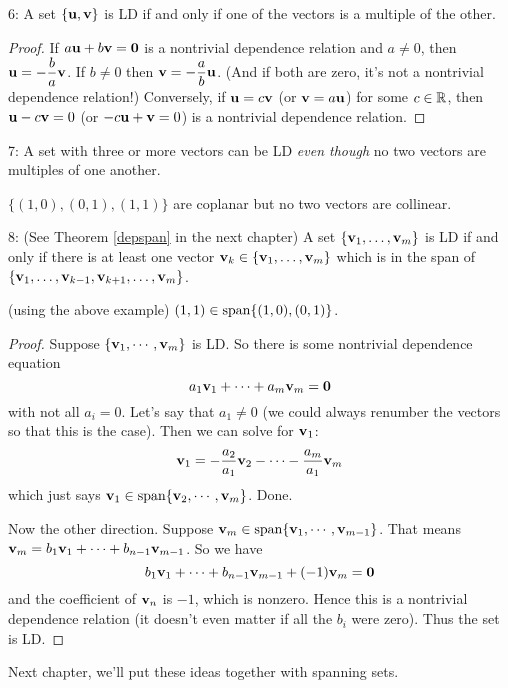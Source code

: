 \begin{fac} 6: A set $\{\mathbf{u},\mathbf{v}\}$ is LD if and only if one of the
vectors is a multiple of the other.\end{fac}

\begin{proof}  If $a\mathbf{u} + b\mathbf{v} = \mathbf{0}$ is a nontrivial dependence
relation and $a\neq 0$, then $\mathbf{u} = -\dfrac{b}{a} \mathbf{v}$.  If $b\neq 0$
then $\mathbf{v} =-\dfrac{a}{b} \mathbf{u}$.  (And if both are zero, it's not a nontrivial
dependence relation!) Conversely, if $\mathbf{u}= c \mathbf{v}$ (or $\mathbf{v}=a\mathbf{u}$) for some $c\in \mathbb{R}$, then $\mathbf{u}-c\mathbf{v}=0$  (or $-c\mathbf{u}+\mathbf{v}=0$) is a nontrivial
dependence relation. \end{proof}

\begin{fac} 7: A set with three or more vectors can be LD \emph{even though} no two vectors are
multiples of one another.\end{fac}

\begin{myexample}  $\{(1,0), (0,1), (1,1)\}$ are coplanar but no two vectors
are collinear. \end{myexample}

\begin{fac} 8: (See Theorem \ref{depspan} in the next chapter)   
A set $\{\mathbf{v}_1, \dots, \mathbf{v}_m\}$ is LD if and only if there is at least
one vector $\mathbf{v}_k \in \{\mathbf{v}_1, \dots, \mathbf{v}_m\}$  which is in the span of $\{\mathbf{v}_1, \dots, \mathbf{v}_{k-1}, \mathbf{v}_{k+1}, \dots,\mathbf{v}_m\}$.\end{fac}

\begin{myexample} (using the above example)  $(1,1) \in \textrm{span}\{(1,0), (0,1)\}$.\end{myexample}


\begin{proof} Suppose $\{\mathbf{v}_1, \cdots, \mathbf{v}_m\}$ is LD.  So there is
some nontrivial dependence equation
$$
a_1\mathbf{v}_1 + \cdots + a_m\mathbf{v}_m = \mathbf{0}
$$
with not all $a_i = 0$.  Let's say that $a_1 \neq 0$ (we could always
renumber the vectors so that this is the case).  Then we can solve for
$\mathbf{v}_1$:
$$
\mathbf{v}_1 = -\frac{a_2}{a_1}\mathbf{v}_2 - \cdots - \frac{a_m}{a_1}\mathbf{v}_m
$$
which just says $\mathbf{v}_1 \in \textrm{span}\{ \mathbf{v}_2, \cdots, \mathbf{v}_m\}$.  Done.

Now the other direction.  Suppose $\mathbf{v}_m \in \textrm{span}\{ \mathbf{v}_1, \cdots, \mathbf{v}_{m-1}\}$.
That means $\mathbf{v}_m = b_1\mathbf{v}_1 + \cdots + b_{n-1}\mathbf{v}_{m-1}$.  So we have
$$
b_1\mathbf{v}_1 + \cdots + b_{n-1}\mathbf{v}_{m-1} + (-1)\mathbf{v}_m = \mathbf{0}
$$ 
and the coefficient of $\mathbf{v}_n$ is $-1$, which is nonzero.  Hence this
is a nontrivial dependence relation (it doesn't even matter if all
the $b_i$ were zero).  Thus the set is LD.
\end{proof}

Next chapter, we'll put these ideas together with spanning sets.





